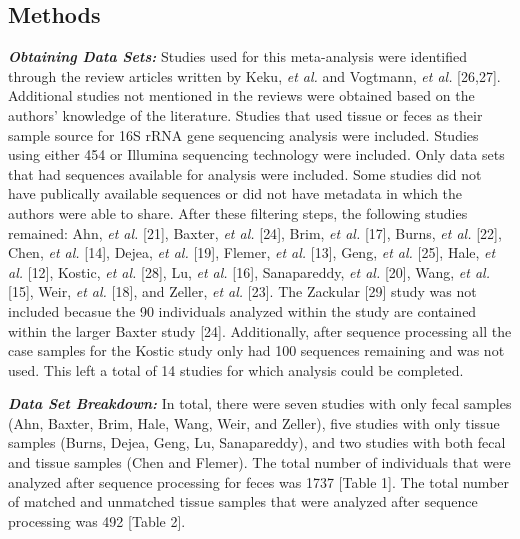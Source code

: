 \documentclass[12pt,]{article}
\begin{document}
\newpage

\subsection{Methods}\label{methods}

\textbf{\emph{Obtaining Data Sets:}} Studies used for this meta-analysis
were identified through the review articles written by Keku, \emph{et
al.} and Vogtmann, \emph{et al.} {[}26,27{]}. Additional studies not
mentioned in the reviews were obtained based on the authors' knowledge
of the literature. Studies that used tissue or feces as their sample
source for 16S rRNA gene sequencing analysis were included. Studies
using either 454 or Illumina sequencing technology were included. Only
data sets that had sequences available for analysis were included. Some
studies did not have publically available sequences or did not have
metadata in which the authors were able to share. After these filtering
steps, the following studies remained: Ahn, \emph{et al.} {[}21{]},
Baxter, \emph{et al.} {[}24{]}, Brim, \emph{et al.} {[}17{]}, Burns,
\emph{et al.} {[}22{]}, Chen, \emph{et al.} {[}14{]}, Dejea, \emph{et
al.} {[}19{]}, Flemer, \emph{et al.} {[}13{]}, Geng, \emph{et al.}
{[}25{]}, Hale, \emph{et al.} {[}12{]}, Kostic, \emph{et al.} {[}28{]},
Lu, \emph{et al.} {[}16{]}, Sanapareddy, \emph{et al.} {[}20{]}, Wang,
\emph{et al.} {[}15{]}, Weir, \emph{et al.} {[}18{]}, and Zeller,
\emph{et al.} {[}23{]}. The Zackular {[}29{]} study was not included
becasue the 90 individuals analyzed within the study are contained
within the larger Baxter study {[}24{]}. Additionally, after sequence
processing all the case samples for the Kostic study only had 100
sequences remaining and was not used. This left a total of 14 studies
for which analysis could be completed.

\textbf{\emph{Data Set Breakdown:}} In total, there were seven studies
with only fecal samples (Ahn, Baxter, Brim, Hale, Wang, Weir, and
Zeller), five studies with only tissue samples (Burns, Dejea, Geng, Lu,
Sanapareddy), and two studies with both fecal and tissue samples (Chen
and Flemer). The total number of individuals that were analyzed after
sequence processing for feces was 1737 {[}Table 1{]}. The total number
of matched and unmatched tissue samples that were analyzed after
sequence processing was 492 {[}Table 2{]}.
\end{document}

